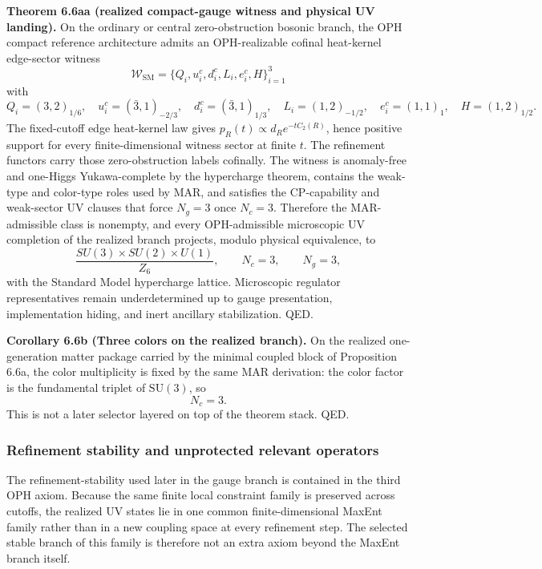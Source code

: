 \textbf{Theorem 6.6aa (realized compact-gauge witness and physical UV landing).} On the ordinary or central zero-obstruction bosonic branch, the OPH compact reference architecture admits an OPH-realizable cofinal heat-kernel edge-sector witness
\[
\mathcal W_{\mathrm{SM}}
=
\{Q_i,u_i^c,d_i^c,L_i,e_i^c,H\}_{i=1}^{3}
\]
with
\[
Q_i=(3,2)_{1/6},\quad
u_i^c=(\bar 3,1)_{-2/3},\quad
d_i^c=(\bar 3,1)_{1/3},\quad
L_i=(1,2)_{-1/2},\quad
e_i^c=(1,1)_1,\quad
H=(1,2)_{1/2}.
\]
The fixed-cutoff edge heat-kernel law gives \(p_R(t)\propto d_R e^{-tC_2(R)}\), hence positive support for every finite-dimensional witness sector at finite \(t\). The refinement functors carry those zero-obstruction labels cofinally. The witness is anomaly-free and one-Higgs Yukawa-complete by the hypercharge theorem, contains the weak-type and color-type roles used by MAR, and satisfies the CP-capability and weak-sector UV clauses that force \(N_g=3\) once \(N_c=3\). Therefore the MAR-admissible class is nonempty, and every OPH-admissible microscopic UV completion of the realized branch projects, modulo physical equivalence, to
\[
\frac{SU(3)\times SU(2)\times U(1)}{Z_6},
\qquad
N_c=3,\qquad
N_g=3,
\]
with the Standard Model hypercharge lattice. Microscopic regulator representatives remain underdetermined up to gauge presentation, implementation hiding, and inert ancillary stabilization. QED.

\textbf{Corollary 6.6b (Three colors on the realized branch).} On the realized one-generation matter package carried by the minimal coupled block of Proposition 6.6a, the color multiplicity is fixed by the same MAR derivation: the color factor is the fundamental triplet of \(\mathrm{SU}(3)\), so
\[
N_c=3.
\]
This is not a later selector layered on top of the theorem stack. QED.

\subsubsection{Refinement stability and unprotected relevant operators}\label{63-refinement-stability-and-unprotected-relevant-operators}

The refinement-stability used later in the gauge branch is contained in the third OPH axiom. Because the same finite local constraint family is preserved across cutoffs, the realized UV states lie in one common finite-dimensional MaxEnt family rather than in a new coupling space at every refinement step. The selected stable branch of this family is therefore not an extra axiom beyond the MaxEnt branch itself.

